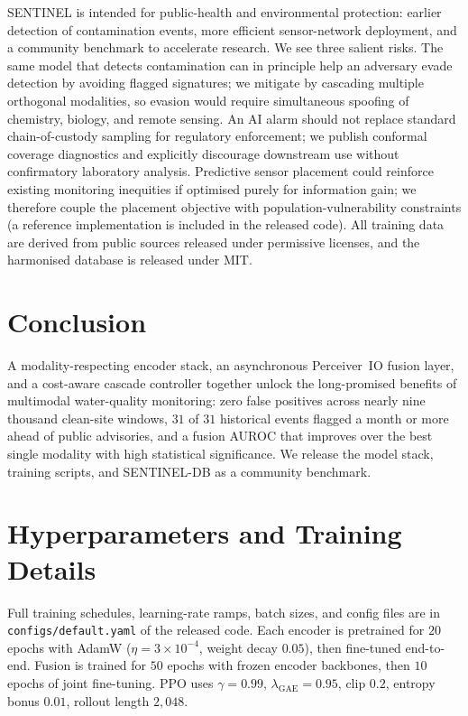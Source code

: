 \documentclass{article}
\begin{document}
SENTINEL is intended for public-health and environmental protection: earlier detection of contamination events, more efficient sensor-network deployment, and a community benchmark to accelerate research. We see three salient risks. The same model that detects contamination can in principle help an adversary evade detection by avoiding flagged signatures; we mitigate by cascading multiple orthogonal modalities, so evasion would require simultaneous spoofing of chemistry, biology, and remote sensing. An AI alarm should not replace standard chain-of-custody sampling for regulatory enforcement; we publish conformal coverage diagnostics and explicitly discourage downstream use without confirmatory laboratory analysis. Predictive sensor placement could reinforce existing monitoring inequities if optimised purely for information gain; we therefore couple the placement objective with population-vulnerability constraints (a reference implementation is included in the released code). All training data are derived from public sources released under permissive licenses, and the harmonised database is released under MIT.

\section{Conclusion}

A modality-respecting encoder stack, an asynchronous Perceiver~IO fusion layer, and a cost-aware cascade controller together unlock the long-promised benefits of multimodal water-quality monitoring: zero false positives across nearly nine thousand clean-site windows, $31$ of $31$ historical events flagged a month or more ahead of public advisories, and a fusion AUROC that improves over the best single modality with high statistical significance. We release the model stack, training scripts, and SENTINEL-DB as a community benchmark.

\small



\appendix
\normalsize
\section{Hyperparameters and Training Details}
\label{app:hp}
Full training schedules, learning-rate ramps, batch sizes, and config files are in \texttt{configs/default.yaml} of the released code. Each encoder is pretrained for $20$ epochs with AdamW ($\eta\!=\!3{\times}10^{-4}$, weight decay $0.05$), then fine-tuned end-to-end. Fusion is trained for $50$ epochs with frozen encoder backbones, then $10$ epochs of joint fine-tuning. PPO uses $\gamma\!=\!0.99$, $\lambda_\text{GAE}\!=\!0.95$, clip $0.2$, entropy bonus $0.01$, rollout length $2{,}048$.
\end{document}
